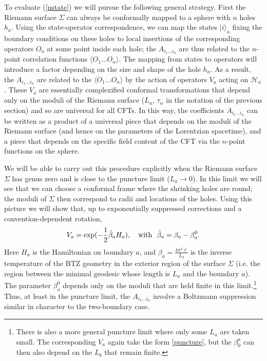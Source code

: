 \documentclass[12pt]{article}
\numberwithin{equation}{section}
\begin{document}
To evaluate (\ref{nstate}) we will pursue the following general strategy.   First the Riemann surface $\Sigma$ can always be conformally mapped to a sphere with $n$ holes $h_a$.   Using the state-operator correspondence, we can map the states  $|i \rangle_a$ fixing the boundary conditions on these holes to local insertions of the corresponding operators $O_a$ at some point inside each hole; the  $A_{i_1  \ldots i_n}$ are thus related to the $n$-point correlation functions $\langle O_1 \dots O_n \rangle$.
The mapping from states to operators will introduce a factor depending on the size and shape of the hole $h_a$.  As a result, the $A_{i_1 \ldots i_n}$ are related to the $\langle O_1 \dots O_n \rangle$ by the action of operators $V_a$ acting on $\mathcal H_a$.   These $V_a$ are essentially complexified conformal transformations that depend only on the moduli of the Riemann surface ($L_a$, $\tau_\alpha$ in the notation of the previous section) and so are universal for all CFTs.   In this way, the coefficients $A_{i_1 \ldots i_n}$ can be written as a product of a universal piece that depends on the moduli of the Riemann surface (and hence on the parameters of the Lorentzian spacetime), and a piece that depends on the specific field content of the CFT via the $n$-point functions on the sphere.


We will be able to carry out this procedure explicitly when the  Riemann surface $\Sigma$ has genus zero and is close to the puncture limit ($L_a \rightarrow 0$). In this limit we will see that  we can choose a conformal frame where the shrinking holes are round; the moduli of $\Sigma$ then correspond to radii and locations of the holes. Using this picture we will show that, up to exponentially suppressed corrections and a convention-dependent rotation,
\begin{equation}
\label{puncture}
V_a = \exp(-\frac{1}{2} \hat \beta_a H_a), \ \ \ {\rm with} \ \ \hat \beta_a = \beta_a - \beta^0_a.
\end{equation}
Here $H_a$ is the Hamiltonian on boundary $a$, and $\beta_a= \frac{4\pi^2 \ell}{L_a}$ is the inverse temperature of the BTZ geometry in the exterior region of the surface $\Sigma$ (i.e. the region between the minimal geodesic whose length is $L_a$ and the boundary $a$).   The parameter $\beta^0_a$ depends only on the moduli that are held finite in this limit.\footnote{There is also a more general puncture limit where only some $L_a$ are taken small.  The corresponding $V_a$ again take the form \eqref{puncture}, but the $\beta_0^a$ can then also depend on the $L_b$ that remain finite.}  Thus, at least in the puncture limit, the $A_{i_1 \ldots i_n}$ involve a Boltzmann suppression similar in character to the two-boundary case.
\end{document}
